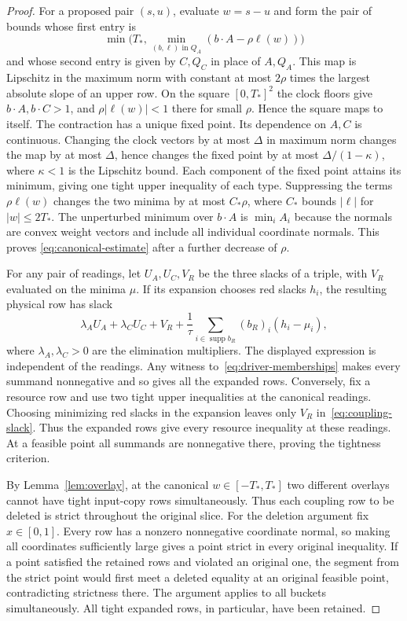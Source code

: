 \begin{proof}
For a proposed pair $(s,u)$, evaluate $w=s-u$ and form the pair of bounds
whose first entry is
\[
      \min\bigl(T_*,\min_{(b,\ell)\text{ in }Q_A}
                              (b\cdot A-\rho\ell(w))\bigr)
\]
and whose second entry is given by $C,Q_C$ in place of $A,Q_A$. This map
is Lipschitz in the maximum norm with constant at most $2\rho$ times the
largest absolute slope of an upper row. On the square $[0,T_*]^2$ the
clock floors give $b\cdot A,b\cdot C>1$, and $\rho|\ell(w)|<1$ there for
small $\rho$. Hence the square maps to itself. The contraction has a unique fixed point. Its dependence on \(A,C\)
is continuous. Changing the clock vectors by at most \(\Delta\) in
maximum norm changes the map by at most \(\Delta\), hence changes the
fixed point by at most \(\Delta/(1-\kappa)\), where \(\kappa<1\)
is the Lipschitz bound. Each component of the fixed point attains its
minimum, giving one tight upper inequality of each type. Suppressing the terms $\rho\ell(w)$ changes the two
minima by at most $C_*\rho$, where $C_*$ bounds $|\ell|$ for
$|w|\le 2T_*$. The unperturbed minimum over $b\cdot A$ is $\min_i A_i$
because the normals are convex weight vectors and include all individual
coordinate normals. This proves \eqref{eq:canonical-estimate} after a
further decrease of $\rho$.

For any pair of readings, let $U_A,U_C,V_R$ be the three slacks of a
triple, with $V_R$ evaluated on the minima $\mu$. If its expansion
chooses red slacks $h_i$, the resulting physical row has slack
\begin{equation}\label{eq:coupling-slack}
  \lambda_A U_A+\lambda_C U_C+V_R+
    \frac{1}{\tau}\sum_{i\in\operatorname{supp} b_R}(b_R)_i(h_i-\mu_i),
\end{equation}
where $\lambda_A,\lambda_C>0$ are the elimination multipliers. The displayed
expression is independent of the readings. Any witness
to~\eqref{eq:driver-memberships} makes every summand nonnegative and so
gives all the expanded rows. Conversely, fix a resource row and use two
tight upper inequalities at the canonical readings. Choosing minimizing
red slacks in the expansion leaves only $V_R$ in~\eqref{eq:coupling-slack}.
Thus the expanded rows give every resource inequality at these readings.
At a feasible point all summands are nonnegative there, proving the
tightness criterion.

By Lemma~\ref{lem:overlay}, at the canonical $w\in[-T_*,T_*]$ two
different overlays cannot have tight input-copy rows simultaneously. Thus
each coupling row to be deleted is strict throughout the original slice.
For the deletion argument fix $x\in[0,1]$. Every row has a
nonzero nonnegative coordinate normal, so making all coordinates sufficiently
large gives a point strict in every original inequality. If a point
satisfied the retained rows and violated an original one, the segment
from the strict point would first meet a deleted equality at an original
feasible point, contradicting strictness there. The argument applies to
all buckets simultaneously. All tight expanded rows, in particular, have
been retained.
\end{proof}


